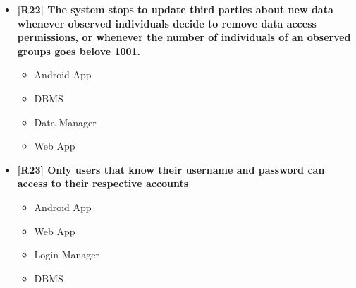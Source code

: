 \begin{itemize}
\item \textbf{[R22] The system stops to update third parties about new data whenever observed individuals decide to remove data access permissions, or whenever the number of individuals of an observed groups goes belove 1001.}
\begin{itemize}
\item Android App
\item DBMS
\item Data Manager
\item Web App
\end{itemize}


\item \textbf{[R23] Only users that know their username and password can access to their respective accounts}
\begin{itemize}
\item Android App
\item Web App
\item Login Manager
\item DBMS
\end{itemize}
\end{itemize}




